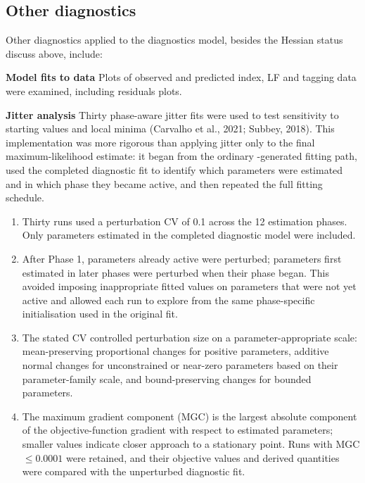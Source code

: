 \documentclass[
  english,
  a4paper,
  a4paper,
  11pt]{SCreport}
\begin{document}
\subsection{Other diagnostics}\label{other-diagnostics}

Other diagnostics applied to the diagnostics model, besides the Hessian
status discuss above, include:

\textbf{Model fits to data} Plots of observed and predicted index, LF
and tagging data were examined, including residuals plots.

\textbf{Jitter analysis} Thirty phase-aware jitter fits were used to
test sensitivity to starting values and local minima (Carvalho et al.,
2021; Subbey, 2018). This implementation was more rigorous than applying
jitter only to the final maximum-likelihood estimate: it began from the
ordinary -generated fitting path, used the completed
diagnostic fit to identify which parameters were estimated and in which
phase they became active, and then repeated the full fitting schedule.

\begin{enumerate}
\def\labelenumi{\arabic{enumi}.}
\item
  Thirty runs used a perturbation CV of 0.1 across the 12 estimation
  phases. Only parameters estimated in the completed diagnostic model
  were included.
\item
  After Phase 1, parameters already active were perturbed; parameters
  first estimated in later phases were perturbed when their phase began.
  This avoided imposing inappropriate fitted values on parameters that
  were not yet active and allowed each run to explore from the same
  phase-specific initialisation used in the original fit.
\item
  The stated CV controlled perturbation size on a parameter-appropriate
  scale: mean-preserving proportional changes for positive parameters,
  additive normal changes for unconstrained or near-zero parameters
  based on their parameter-family scale, and bound-preserving changes
  for bounded parameters.
\item
  The maximum gradient component (MGC) is the largest absolute component
  of the objective-function gradient with respect to estimated
  parameters; smaller values indicate closer approach to a stationary
  point. Runs with MGC \(\leq 0.0001\) were retained, and their
  objective values and derived quantities were compared with the
  unperturbed diagnostic fit.
\end{enumerate}
\end{document}

